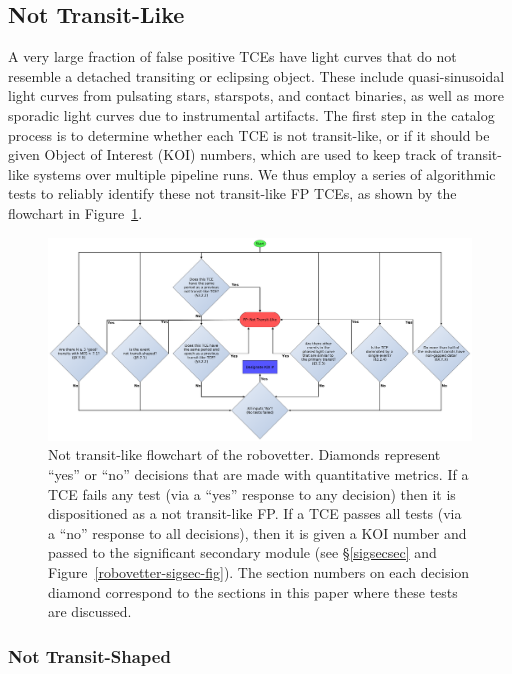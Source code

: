 \subsection{Not Transit-Like}
\label{nottransitlikesec}

A very large fraction of false positive TCEs have light curves that do not resemble a detached transiting or eclipsing object. These include quasi-sinusoidal light curves from pulsating stars, starspots, and contact binaries, as well as more sporadic light curves due to instrumental artifacts. The first step in the catalog process is to determine whether each TCE is not transit-like, or if it should be given \kepler{} Object of Interest (KOI) numbers, which are used to keep track of transit-like systems over multiple \kepler{} pipeline runs. We thus employ a series of algorithmic tests to reliably identify these not transit-like FP TCEs, as shown by the flowchart in Figure~\ref{robovetter-transitlike-fig}.


\begin{figure}[ht]
\centering
\includegraphics[width=\linewidth]{RoboVetter-Diagram-V4-TransitLike.pdf}
\caption{Not transit-like flowchart of the robovetter. Diamonds represent ``yes'' or ``no'' decisions that are made with quantitative metrics. If a TCE fails any test (via a ``yes'' response to any decision) then it is dispositioned as a not transit-like FP. If a TCE passes all tests (via a ``no'' response to all decisions), then it is given a KOI number and passed to the significant secondary module (see \S\ref{sigsecsec} and Figure~\ref{robovetter-sigsec-fig}). The section numbers on each decision diamond correspond to the sections in this paper where these tests are discussed.}
\label{robovetter-transitlike-fig}
\end{figure}


\subsubsection{Not Transit-Shaped}

